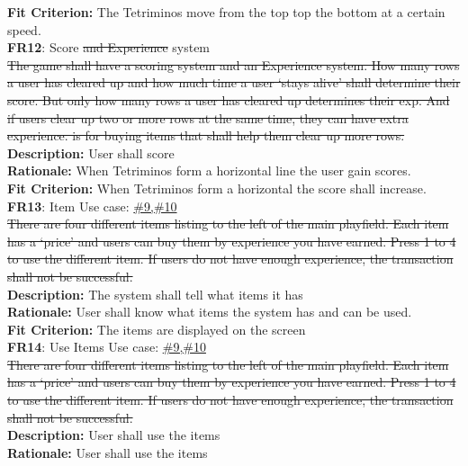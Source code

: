 \documentclass[12pt, titlepage]{article}
\begin{document}
\textbf{Fit Criterion:} {\color{red}    The Tetriminos move from the top top the bottom at a certain speed.} \\
\newline
\textbf{FR12}: Score \st{ and Experience }system\\
\st{The game shall have a scoring system and an Experience system. How many rows a user has cleared up and how much time a user ‘stays alive’ shall determine their score. But only how many rows a user has cleared up determines their exp. And if users clear up two or more rows at the same time, they can have extra experience.  is for buying items that shall help them clear up more rows.}\\
 \textbf{Description:} {\color{red}    User shall score} \\ 
\textbf{Rationale: }{\color{red}     When Tetriminos form a horizontal line the user gain scores.} \\ 
\textbf{Fit Criterion:} {\color{red}    When Tetriminos form a horizontal the score shall increase.} \\
\newline
\textbf{FR13}: Item \tab Use case: \hyperref[event:usesitem]{\#9,\#10} \\
\st{There are four different items listing to the left of the main playfield. Each item has a ‘price’ and users can buy them by experience you have earned. Press 1 to 4 to use the different item. If users do not have enough experience, the transaction shall not be successful.}\\
 \textbf{Description:} {\color{red}    The system shall tell what items it has} \\ 
\textbf{Rationale: }{\color{red}     User shall know what items the system has and can be used.} \\ 
\textbf{Fit Criterion:} {\color{red}    The items are displayed on the screen} \\
\newline
\textbf{FR14}: Use Items \tab Use case: \hyperref[event:usesitem]{\#9,\#10} \\
\st{There are four different items listing to the left of the main playfield. Each item has a ‘price’ and users can buy them by experience you have earned. Press 1 to 4 to use the different item. If users do not have enough experience, the transaction shall not be successful.}\\
 \textbf{Description:} {\color{red}    User shall use the items} \\ 
\textbf{Rationale: }{\color{red}     User shall use the items} \\ 
\end{document}
